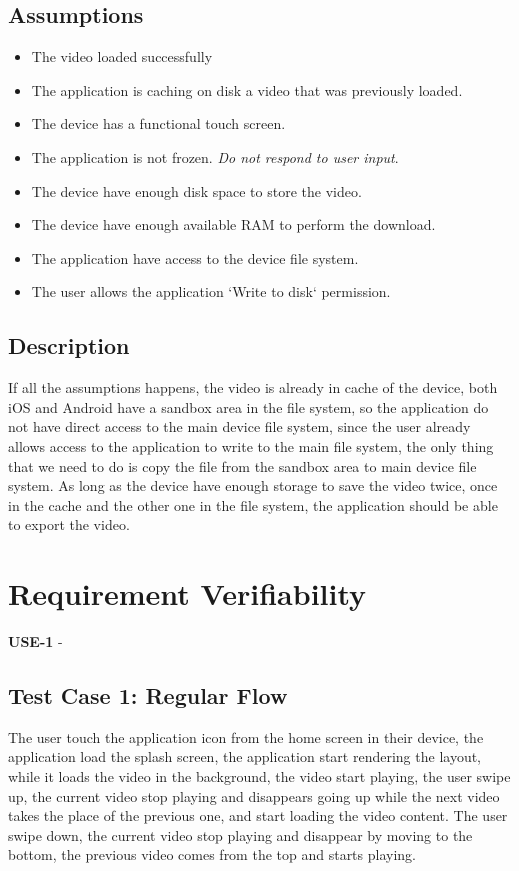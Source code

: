 \documentclass[a4paper,10pt]{article}
\begin{document}
\subsection{Assumptions}
\begin{itemize}
    \item The video loaded successfully
    \item The application is caching on disk a video that was previously loaded.
    \item The device has a functional touch screen.
    \item The application is not frozen. \textit{Do not respond to user input}.
    \item The device have enough disk space to store the video.
    \item The device have enough available RAM to perform the download.
    \item The application have access to the device file system.
    \item The user allows the application `Write to disk` permission.
\end{itemize}

\subsection{Description}
If all the assumptions happens, the video is already in cache of the device, 
both iOS and Android have a sandbox area in the file system, so the application
do not have direct access to the main device file system, since the user 
already allows access to the application to write to the main file system, the 
only thing that we need to do is copy the file from the sandbox area to main
device file system. As long as the device have enough storage 
to save the video twice, once in the cache and the other one in the file 
system, the application should be able to export the video.

\pagebreak

\section{Requirement Verifiability}
\textbf{USE-1} - 


\subsection{Test Case 1: Regular Flow}
The user touch the application icon from the home screen in their device, the 
application load the splash screen, the application start rendering the layout,
while it loads the video in the background, the video start playing, 
the user swipe up, the current video stop playing and disappears going up while 
the next video takes the place of the previous one, and start loading the video 
content. The user swipe down, the current video stop playing and disappear by 
moving to the bottom, the previous video comes from the top and starts playing.
\end{document}
